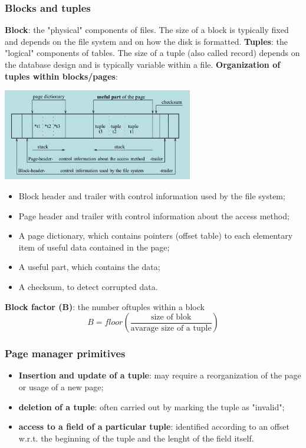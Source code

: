 \subsubsection{Blocks and tuples}
\textbf{Block}: the "physical" components of files. The size of a block is typically fixed and depends on the file system and on how the disk is formatted.\newline
\newline
\textbf{Tuples}: the "logical" components of tables. The size of a tuple (also called record) depends on the database design and is typically variable within a file.
\newline
\newline
\textbf{Organization of tuples within blocks/pages}:
\begin{center}
    \includegraphics[height=4cm]{../arguments/organizationoftuples.JPG}
\end{center}
\begin{itemize}
    \item Block header and trailer with control information used by the file system;
    \item Page header and trailer with control information about the access method;
    \item A page dictionary, which contains pointers (offset table) to each elementary item of useful data contained in the page;
    \item A useful part, which contains the data;
    \item A checksum, to detect corrupted data.
\end{itemize}
\textbf{Block factor (B)}: the number oftuples within a block
\[
    B = floor\left(\frac{\text{size of blok}}{\text{avarage size of a tuple}}\right)
\]
\subsubsection{Page manager primitives}
\begin{itemize}
    \item \textbf{Insertion and update of a tuple}: may require a reorganization of the page or usage of a new page;
    \item \textbf{deletion of a tuple}: often carried out by marking the tuple as "invalid";
    \item \textbf{access to a field of a particular tuple}: identified according to an offset w.r.t. the beginning of the tuple and the lenght of the field itself.
\end{itemize}
